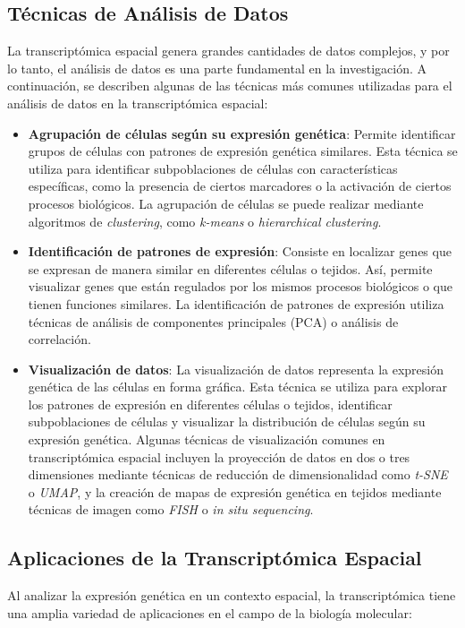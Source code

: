 \documentclass[12pt,oneside]{book} %
\begin{document}
\subsection{Técnicas de Análisis de Datos}
La transcriptómica espacial genera grandes cantidades de datos complejos, y por lo tanto, el análisis de datos es una parte fundamental en la investigación. A continuación, se describen algunas de las técnicas más comunes utilizadas para el análisis de datos en la transcriptómica espacial:

\begin{itemize}
\item
\textbf{Agrupación de células según su expresión genética}: Permite identificar grupos de células con patrones de expresión genética similares. Esta técnica se utiliza para identificar subpoblaciones de células con características específicas, como la presencia de ciertos marcadores o la activación de ciertos procesos biológicos. La agrupación de células se puede realizar mediante algoritmos de \textit{clustering}, como \textit{k-means} o \textit{hierarchical clustering}.
\item
\textbf{Identificación de patrones de expresión}: Consiste en localizar genes que se expresan de manera similar en diferentes células o tejidos. Así, permite visualizar genes que están regulados por los mismos procesos biológicos o que tienen funciones similares. La identificación de patrones de expresión utiliza técnicas de análisis de componentes principales (PCA) o análisis de correlación.
\item
\textbf{Visualización de datos}: La visualización de datos representa la expresión genética de las células en forma gráfica. Esta técnica se utiliza para explorar los patrones de expresión en diferentes células o tejidos, identificar subpoblaciones de células y visualizar la distribución de células según su expresión genética. Algunas técnicas de visualización comunes en transcriptómica espacial incluyen la proyección de datos en dos o tres dimensiones mediante técnicas de reducción de dimensionalidad como \textit{t-SNE} o \textit{UMAP}, y la creación de mapas de expresión genética en tejidos mediante técnicas de imagen como \textit{FISH} o \textit{in situ sequencing}. \\
\end{itemize}

\subsection{Aplicaciones de la Transcriptómica Espacial}
Al analizar la expresión genética en un contexto espacial, la transcriptómica tiene una amplia variedad de aplicaciones en el campo de la biología molecular:
\end{document}
